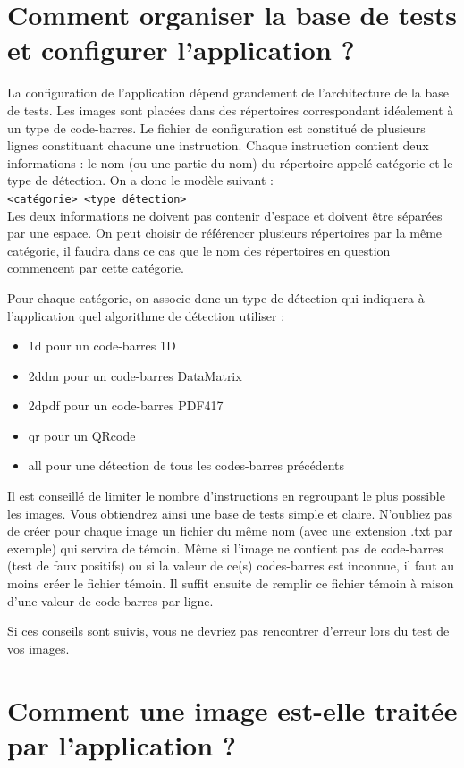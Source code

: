 \chapter{Comment organiser la base de tests et configurer l'application ?}
\label{configFile}
La configuration de l'application dépend grandement de l'architecture de la base de tests. Les images sont placées dans des répertoires correspondant idéalement à un type de code-barres. Le fichier de configuration est constitué de plusieurs lignes constituant chacune une instruction. Chaque instruction contient deux informations : le nom (ou une partie du nom) du répertoire appelé catégorie et le type de détection. On a donc le modèle suivant :
\\\verb|<catégorie> <type détection>|\\
Les deux informations ne doivent pas contenir d'espace et doivent être séparées par une espace. On peut choisir de référencer plusieurs répertoires par la même catégorie, il faudra dans ce cas que le nom des répertoires en question commencent par cette catégorie.

Pour chaque catégorie, on associe donc un type de détection qui indiquera à l'application quel algorithme de détection utiliser :
\begin{itemize}
 \item \og 1d \fg{} pour un code-barres 1D
 \item \og 2ddm \fg{} pour un code-barres DataMatrix
 \item \og 2dpdf \fg{} pour un code-barres PDF417
 \item \og qr \fg{} pour un QRcode
 \item \og all \fg{} pour une détection de tous les codes-barres précédents
\end{itemize}

Il est conseillé de limiter le nombre d'instructions en regroupant le plus possible les images. Vous obtiendrez ainsi une base de tests simple et claire. N'oubliez pas de créer pour chaque image un fichier du même nom (avec une extension .txt par exemple) qui servira de témoin. Même si l'image ne contient pas de code-barres (test de faux positifs) ou si la valeur de ce(s) codes-barres est inconnue, il faut au moins créer le fichier témoin. Il suffit ensuite de remplir ce fichier témoin à raison d'une valeur de code-barres par ligne.

Si ces conseils sont suivis, vous ne devriez pas rencontrer d'erreur lors du test de vos images.

\chapter{Comment une image est-elle traitée par l'application ?}

